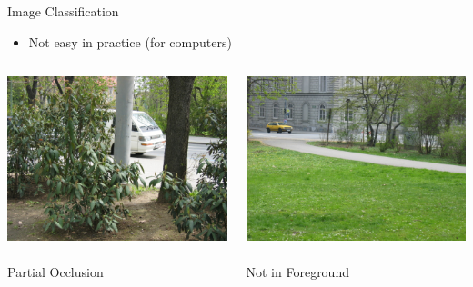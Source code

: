 \documentclass{beamer}
\begin{document}
\begin{frame}{Image Classification}
\vspace{-0.5cm}
    \begin{itemize}
        \item Not easy in practice (for computers)
    \end{itemize}
\vspace{-0.5cm}
  \begin{columns}[T]
    \begin{column}{.5\textwidth}
    \begin{center} \includegraphics[scale=0.25]{img/cars2} \\~\\ {\Large Partial Occlusion} \end{center}
    \end{column}
    \begin{column}{.5\textwidth}
    \begin{center} \includegraphics[scale=0.25]{img/cars3} \\~\\ {\Large Not in Foreground}  \end{center}
    \end{column}
  \end{columns}
  
\end{frame}
\end{document}
